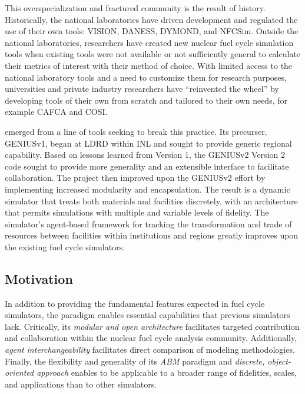 This overspecialization and fractured community is the result of history. 
Historically, the national laboratories have driven development and regulated 
the use of their own tools: \gls{VISION}\cite{jacobson_verifiable_2010}, 
\gls{DANESS}\cite{van_den_durpel_daness_2009}, 
\gls{DYMOND}\cite{yacout_modeling_2005}, and 
\gls{NFCSim}\cite{schneider_nfcsim:_2005}.  Outside the national laboratories, 
researchers have created new nuclear fuel cycle simulation tools when existing 
tools were not available or not sufficiently general to calculate their metrics 
of interest with their method of choice.  With limited access to the national 
laboratory tools and a need to customize them for research purposes, 
universities and private industry researchers have ``reinvented the wheel'' by 
developing tools of their own from scratch and tailored to their own needs, for 
example \gls{CAFCA}\cite{guerin_impact_2009} and 
\gls{COSI}\cite{boucher_cosi_2005,boucher_cosi:_2006,meyer_new_2009,coquelet-pascal_comparison_2011}. 

\Cyclus emerged from a line of tools seeking to break this practice. 
Its precurser,
\gls{GENIUSv1}\cite{dunzik-gougar_global_2007,jain_transitioning_2006}, began
at \gls{LDRD} within \gls{INL} and sought 
to provide generic regional capability.  Based on lessons learned from 
Version 1, the 
\acrshort{GENIUSv2} Version 2\cite{oliver_studying_2009,huff_geniusv2_2009} code sought to 
provide more generality and an extensible interface to facilitate 
collaboration.  The \Cyclus project then improved upon the \acrshort{GENIUSv2} 
effort by implementing increased modularity and encapsulation.  The result is  
a dynamic simulator that treats both materials and facilities discretely, with 
an architecture that permits simulations with multiple and variable levels of 
fidelity. The simulator's agent-based framework for tracking the 
transformation and trade of resources between facilities within institutions 
and regions greatly improves upon the existing fuel cycle simulators.

\subsection{Motivation}

In addition to providing the fundamental features expected in fuel cycle 
simulators, the \Cyclus paradigm enables essential capabilities that previous 
simulators lack. Critically, its \emph{modular and open architecture}  facilitates 
targeted contribution and collaboration within the nuclear fuel cycle analysis 
community.  Additionally, \emph{agent interchangeability} facilitates direct 
comparison of modeling methodologies. Finally, the flexibility and generality 
of its \emph{\gls{ABM}} paradigm and \emph{discrete, object-oriented approach} 
enables \Cyclus to be applicable to a broader range of 
fidelities, scales, and applications than to other simulators. 

